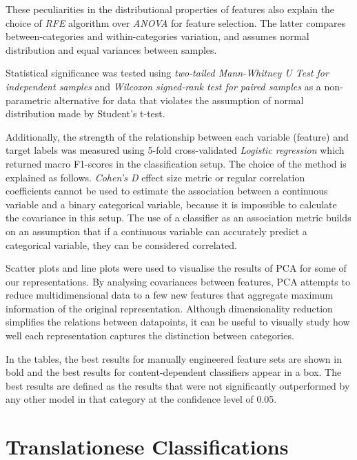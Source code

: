 These peculiarities in the distributional properties of features also explain the choice of \textit{RFE} algorithm over \textit{ANOVA} for feature selection. The latter compares between-categories and within-categories variation, and assumes normal distribution and equal variances between samples.

Statistical significance was tested using \textit{two-tailed Mann-Whitney U Test for independent samples} and \textit{Wilcoxon signed-rank test for paired samples} as a non-parametric alternative for data that violates the assumption of normal distribution made by Student's t-test.

Additionally, the strength of the relationship between each variable (feature) and target labels was measured using 5-fold cross-validated \textit{Logistic regression} which returned macro F1-scores in the classification setup. 
The choice of the method is explained as follows. \textit{Cohen's D} effect size metric or regular correlation coefficients cannot be used to estimate the association between a continuous variable and a binary categorical variable, because it is impossible to calculate the covariance in this setup. The use of a classifier as an association metric builds on an assumption that if a continuous variable can accurately predict a categorical variable, they can be considered correlated. 

Scatter plots and line plots were used to visualise the results of \gls{PCA} for some of our representations. By analysing covariances between features, PCA attempts to reduce multidimensional data to a few new features that aggregate maximum information of the original representation. Although dimensionality reduction simplifies the relations between datapoints, it can be useful to visually study how well each representation captures the distinction between categories. 

In the tables, the best results for manually engineered feature sets are shown in bold and the best results for content-dependent classifiers appear in a box. The best results are defined as the results that were not significantly outperformed by any other model in that category at the confidence level of 0.05. 

\section{\label{sec:detect}Translationese Classifications}

